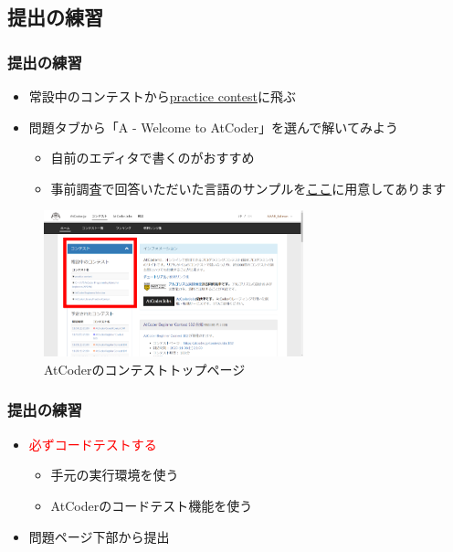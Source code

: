 \documentclass[t, aspectratio=169, dvipdfmx]{beamer}
\begin{document}
\subsection{提出の練習}
\begin{frame}
  \frametitle{提出の練習}
  \begin{itemize}
    \item 常設中のコンテストから\href{https://atcoder.jp/contests/practice}{practice contest}に飛ぶ
    \item 問題タブから「A - Welcome to AtCoder」を選んで解いてみよう
    \begin{itemize}
      \item 自前のエディタで書くのがおすすめ
      \item 事前調査で回答いただいた言語のサンプルを\href{https://github.com/AAAR-Salmon/procon/tree/main/introduction/sample_practice}{ここ}に用意してあります
    \end{itemize}
  \end{itemize}
  \begin{figure}
    \includegraphics[height=120pt]{atcoder_home.png}
    \caption{AtCoderのコンテストトップページ}
    \label{practice_contest}
  \end{figure}
\end{frame}

\begin{frame}
  \frametitle{提出の練習}
  \begin{itemize}
    \item \textcolor{red}{必ずコードテストする}
    \begin{itemize}
      \item 手元の実行環境を使う
      \item AtCoderのコードテスト機能を使う
    \end{itemize}
    \item 問題ページ下部から提出
  \end{itemize}
\end{frame}
\end{document}

